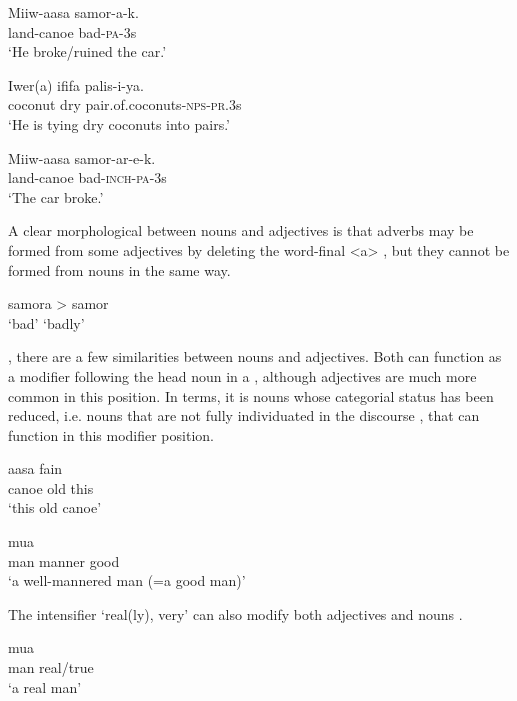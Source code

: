 \ea%
\label{ex:3:x482}
\gll Miiw-aasa samor-a-k. \\
land-canoe bad-\textsc{pa}-3s\\
\glt`He broke/ruined the car.'
\z

\ea%
\label{ex:3:x484}
\gll Iwer(a) ififa palis-i-ya. \\
coconut dry pair.of.coconuts-\textsc{nps}-\textsc{pr}.3s\\
\glt`He is tying dry coconuts into pairs.'
\z

\ea%
\label{ex:3:x483}
\gll Miiw-aasa samor-ar-e-k. \\
land-canoe bad-\textsc{inch}-\textsc{pa}-3s\\
\glt`The car broke.'
\z

A clear morphological  between nouns and adjectives is that adverbs may be formed from some adjectives by deleting the word-final <a> , but they cannot be formed from nouns in the same way.

\ea%
\label{ex:3:x19}
\gll samora {\textgreater} samor\\ 
`bad' {} `badly'\\
\z

, there are a few similarities between nouns and adjectives. Both can function as a modifier following the head noun in a , although adjectives  are much more common in this position. In  terms, it is nouns whose categorial status has been reduced, i.e. nouns that are not fully individuated in the discourse , that can function in this modifier position.

\ea%
\label{ex:3:x9}
\gll aasa  fain \\
canoe old this\\
\glt`this old canoe'
\z

\ea%
\label{ex:3:x10}
\gll mua   \\
man manner good\\
\glt`a well-mannered man (=a good man)'
\z

The intensifier  `real(ly), very' can also modify both adjectives  and nouns .

\ea%
\label{ex:3:x11}
\gll mua  \\
man real/true\\
\glt`a real man'
\z

